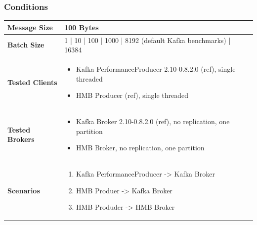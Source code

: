 \subsubsection{Conditions}
\begin{table}[H]
\begin{tabular}{|l| p{12cm}|} \hline
{\bf Message Size}   & 100 Bytes \\ \hline
{\bf Batch Size}     & 1 | 10 | 100 | 1000 | 8192 (default Kafka benchmarks) | 16384 \\ \hline
{\bf Tested Clients} &
    \begin{itemize}
        \item Kafka PerformanceProducer 2.10-0.8.2.0 (ref), single threaded
        \item HMB Producer (ref), single threaded
    \end{itemize}\\ \hline
{\bf Tested Brokers} &
    \begin{itemize}
        \item Kafka Broker 2.10-0.8.2.0 (ref), no replication, one partition
        \item HMB Broker, no replication, one partition
    \end{itemize}\\ \hline
{\bf Scenarios} &
    \begin{enumerate}
        \item Kafka PerformanceProducer -> Kafka Broker
        \item HMB Produer -> Kafka Broker
        \item HMB Produder -> HMB Broker
    \end{enumerate} \\ \hline
\end{tabular}
\end{table}

